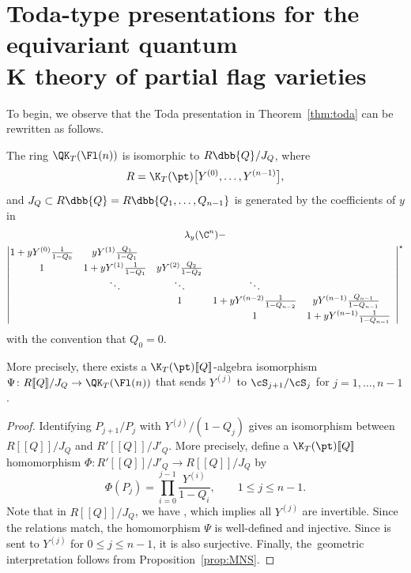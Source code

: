 \section[Toda-type presentations for the equivariant quantum K theory of partial flag varieties]{Toda-type presentations for the equivariant quantum\\ K theory of partial flag varieties}%

To begin, we observe that the Toda presentation in Theorem~\ref{thm:toda} can be rewritten as follows.
\begin{Corollary}\label{cor:fln}
 The ring $\QK_T(\Fl(n))$ is isomorphic to $R\dbb{Q}/J_Q$, where
 \[
 R=\K_T(\pt)\bigl[Y^{(0)}, \dots, Y^{(n-1)}\bigr],
 \]
 and $J_Q\subset R\dbb{Q}=R\dbb{Q_1,\dots,Q_{n-1}}$ is generated by the coefficients of $y$ in
 \begin{gather*}%
 \lambda_y(\C^n) - \\
 \begin{vmatrix}
 1+yY^{(0)}\frac{1}{1-Q_0} & yY^{(1)}\frac{Q_1}{1-Q_1} & & & & \\[1mm]
 1 & 1+yY^{(1)}\frac{1}{1-Q_1} & yY^{(2)}\frac{Q_2}{1-Q_2} & & & \\ %
& \ddots & \ddots & \ddots \\ & & 1 & 1+yY^{(n-2)}\frac{1}{1-Q_{n-2}} & yY^{(n-1)}\frac{Q_{n-1}}{1-Q_{n-1}}\\[1mm] & & & 1 & 1+yY^{(n-1)}\frac{1}{1-Q_{n-1}}
\!\!\!\end{vmatrix}^\star
\end{gather*}
with the convention that $Q_0=0$.

More precisely,
there exists a $\K_T(\pt)[\![Q]\!]$-algebra isomorphism $\Psi\colon R[\![Q]\!]/J_Q \to \QK_T(\Fl(n))$ that sends $Y^{(j)}$ to $\cS_{j+1}/\cS_j$ for $j=1,\dots,n-1$.
\end{Corollary}
\begin{proof}
 Identifying $P_{j+1}/P_j$ with $Y^{(j)}/(1-Q_j)$ gives an isomorphism between $R[\![Q]\!]/J_Q$ and $R'[\![Q]\!]/J'_Q$. More precisely, define a $\K_T(\pt)[\![Q]\!]$ homomorphism $\Phi\colon R'[\![Q]\!]/J'_Q\to R[\![Q]\!]/J_Q$ by
\[
 \Phi(P_j)=\prod_{i=0}^{j-1}\frac{Y^{(i)}}{1-Q_i}, \qquad 1\leq j\leq n-1.
\]
Note that in $R[\![Q]\!]/J_Q$, we have , which implies all $Y^{(j)}$ are invertible. Since the relations match, the homomorphism $\Psi$ is well-defined and injective. Since  is sent to $Y^{(j)}$ for $0\leq j\leq n-1$, it is also surjective. Finally, the~geometric interpretation follows from Proposition~\ref{prop:MNS}.
\end{proof}

